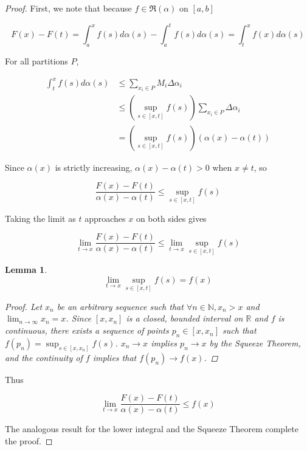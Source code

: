 \documentclass{amsart}
\newcommand{\RiemannIntable}{
  \mathfrak{R}
}
\newtheorem{lemma}[theorem]{Lemma}
\begin{document}
\begin{proof}

First, we note that because $f \in \RiemannIntable(\alpha)$ on $[a, b]$

\[F(x) - F(t) = \int_a^x f(s)d\alpha(s) - \int_a^t f(s) d\alpha(s) = \int_t^x f(x) d\alpha(s)
\]

For all partitions $P$,

\begin{align*}
\int_t^x f(s) d\alpha(s)
& \leq \sum_{x_i \in P} M_i \Delta \alpha_i \\
& \leq \left(\sup_{s \in [x, t]} f(s) \right) \sum_{x_i \in P} \Delta \alpha_i \\
&= \left(\sup_{s \in [x, t]} f(s) \right) (\alpha(x) - \alpha(t))
\end{align*}

Since $\alpha(x)$ is strictly increasing, $\alpha(x) - \alpha(t) > 0$ when $x \neq t$, so

\[
\frac{F(x) - F(t)}{\alpha(x) - \alpha(t)} \leq \sup_{s \in [x, t]} f(s)
\]

Taking the limit as $t$ approaches $x$ on both sides gives

\[
\lim_{t \to x} \frac{F(x) - F(t)}{\alpha(x) - \alpha(t)} \leq \lim_{t \to x} \sup_{s \in [x, t]} f(s)
\]

\begin{lemma}

\[
\lim_{t \to x} \sup_{s \in [x, t]} f(s) = f(x)
\]

\begin{proof}

Let $x_n$ be an arbitrary sequence such that $\forall n \in \mathbb{N}, x_n > x$ and $\lim_{n \to \infty} x_n = x$. Since $[x, x_n]$ is a closed, bounded interval on $\mathbb{R}$ and $f$ is continuous, there exists a sequence of points $p_n \in [x, x_n]$ such that $f(p_n) =  \sup_{s \in [x, x_n]} f(s)$. $x_n \rightarrow x$ implies $p_n \rightarrow x$ by the Squeeze Theorem, and the continuity of $f$ implies that $f(p_n) \rightarrow f(x)$.

\end{proof}
\end{lemma}

Thus

\[
\lim_{t \to x} \frac{F(x) - F(t)}{\alpha(x) - \alpha(t)} \leq f(x)
\]

The analogous result for the lower integral and the Squeeze Theorem complete the proof.

\end{proof}
\end{document}
